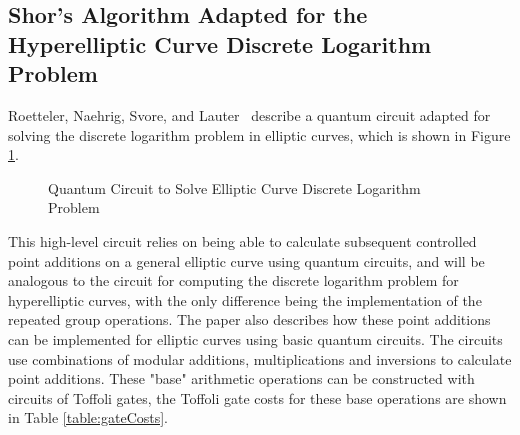 \subsection{Shor's Algorithm Adapted for the Hyperelliptic Curve Discrete
 Logarithm Problem}
Roetteler, Naehrig, Svore, and Lauter~\cite{roetteler2017quantum} describe a quantum circuit adapted for solving the discrete logarithm problem in elliptic curves, which is shown in Figure \ref{fig:ECDLPcircuit}.
\begin{figure}[!htb]
\centering
\resizebox{\linewidth}{!}{}
\caption{Quantum Circuit to Solve Elliptic Curve Discrete Logarithm Problem~\cite{roetteler2017quantum}}
\label{fig:ECDLPcircuit}
\end{figure} 
This high-level circuit relies on being able to calculate subsequent controlled point additions on a general elliptic curve using quantum circuits, and will be analogous to the circuit for computing the discrete logarithm problem for hyperelliptic curves, with the only difference being the implementation of the repeated group operations. The paper also describes how these point additions can be implemented for elliptic curves using basic quantum circuits. The circuits use combinations of modular additions, multiplications and inversions to calculate point additions. These "base" arithmetic operations can be constructed with circuits of Toffoli gates, the Toffoli gate costs for these base operations are shown in Table \ref{table:gateCosts}. 
